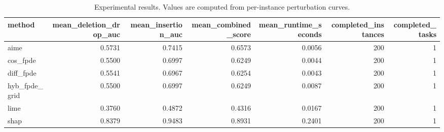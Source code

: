 \begin{table}[t]
\caption{Experimental results. Values are computed from per-instance perturbation curves.}
\label{tab:main_results_computed}
\centering
\begin{tabular}{lrrrrrr}
\toprule
method & mean\_deletion\_drop\_auc & mean\_insertion\_auc & mean\_combined\_score & mean\_runtime\_seconds & completed\_instances & completed\_tasks \\
\midrule
aime & 0.5731 & 0.7415 & 0.6573 & 0.0056 & 200 & 1 \\
cos\_fpde & 0.5500 & 0.6997 & 0.6249 & 0.0044 & 200 & 1 \\
diff\_fpde & 0.5541 & 0.6967 & 0.6254 & 0.0043 & 200 & 1 \\
hyb\_fpde\_grid & 0.5500 & 0.6997 & 0.6249 & 0.0087 & 200 & 1 \\
lime & 0.3760 & 0.4872 & 0.4316 & 0.0167 & 200 & 1 \\
shap & 0.8379 & 0.9483 & 0.8931 & 0.2401 & 200 & 1 \\
\bottomrule
\end{tabular}

\end{table}
